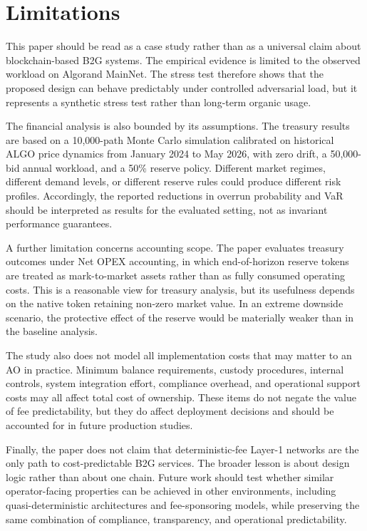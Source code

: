 \documentclass[runningheads]{llncs}
\begin{document}
\section{Limitations}

This paper should be read as a case study rather than as a universal claim about
blockchain-based B2G systems. The empirical evidence is limited to the observed workload on Algorand MainNet. The stress test therefore shows that the
proposed design can behave predictably under controlled adversarial load, but it
represents a synthetic stress test rather than long-term organic usage.

The financial analysis is also bounded by its assumptions. The treasury results
are based on a 10{,}000-path Monte Carlo simulation calibrated on historical ALGO price dynamics from January 2024 to May 2026, with zero drift, a
50{,}000-bid annual workload, and a 50\% reserve policy. Different market
regimes, different demand levels, or different reserve rules could produce
different risk profiles. Accordingly, the reported reductions in overrun
probability and VaR should be interpreted as results for the evaluated setting,
not as invariant performance guarantees.

A further limitation concerns accounting scope. The paper evaluates treasury
outcomes under Net OPEX accounting, in which end-of-horizon reserve tokens are
treated as mark-to-market assets rather than as fully consumed operating costs.
This is a reasonable view for treasury analysis, but its usefulness depends on
the native token retaining non-zero market value. In an extreme downside
scenario, the protective effect of the reserve would be materially weaker than in
the baseline analysis.

The study also does not model all implementation costs that may matter to an
AO in practice. Minimum balance requirements, custody procedures, internal
controls, system integration effort, compliance overhead, and operational support
costs may all affect total cost of ownership. These items do not negate the value
of fee predictability, but they do affect deployment decisions and should be
accounted for in future production studies.

Finally, the paper does not claim that deterministic-fee Layer-1 networks are the
only path to cost-predictable B2G services. The broader lesson is about design
logic rather than about one chain. Future work should test whether similar
operator-facing properties can be achieved in other environments, including
quasi-deterministic architectures and fee-sponsoring models, while preserving the
same combination of compliance, transparency, and operational predictability.
\end{document}

